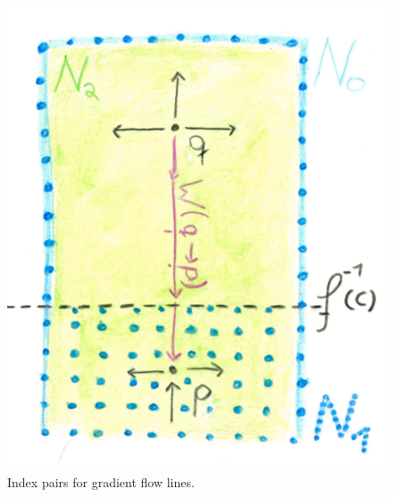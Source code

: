 \begin{figure}[p!]
    \centering
    \includegraphics[width=0.5\linewidth]{Text/Pictures/definitionN_1.pdf}
    \caption{Index pairs for gradient flow lines.}
    \label{fig: Gradient flow lines as isolated compact invariant sets}
\end{figure}\clearpage










































